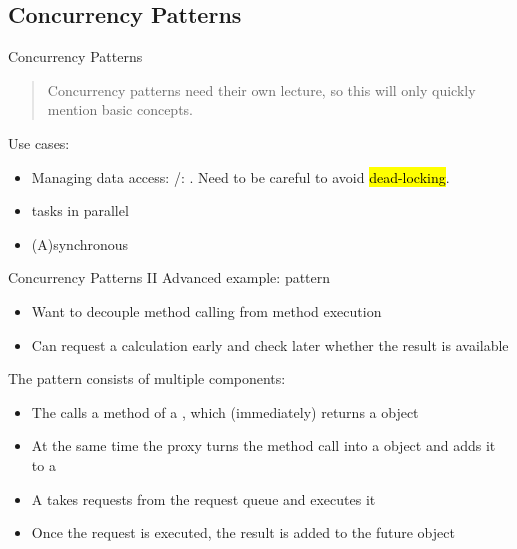 \subsection{Concurrency Patterns}


\begin{frame}{Concurrency Patterns}
	\begin{quote}
		Concurrency patterns need their own lecture, so this will only quickly mention basic concepts.
	\end{quote}

	\bigskip
	Use cases:
	\begin{itemize}
		\item Managing data access: /: . Need to be careful to avoid \hl{dead-locking}.
		\item {} tasks in parallel
		\item (A)synchronous 
	\end{itemize}
\end{frame}

\begin{frame}{Concurrency Patterns II}
	Advanced example:  pattern

	\begin{itemize}
		\item Want to decouple method calling from method execution
		\item Can request a calculation early and check later whether the result is available
	\end{itemize}
	
	\bigskip
	The pattern consists of multiple components:
	\begin{itemize}
		\item The  calls a method of a , which (immediately) returns a  object 
		\item At the same time the proxy turns the method call into a  object and adds it to a 
		\item A  takes requests from the request queue and executes it 
		\item Once the request is executed, the result is added to the future object
	\end{itemize}
\end{frame}
